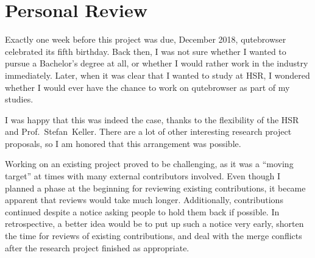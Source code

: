 % 
% 
% 



\section{Personal Review}
Exactly one week before this project was due, December  2018,
qutebrowser celebrated its fifth birthday. Back then, I was not sure whether I
wanted to pursue a Bachelor's degree at all, or whether I would rather work in
the industry immediately. Later, when it was clear that I wanted to study at
HSR, I wondered whether I would ever have the chance to work on qutebrowser as
part of my studies.

I was happy that this was indeed the case, thanks to the flexibility of the
HSR and Prof.~Stefan~Keller. There are a lot of other interesting research
project proposals, so I am honored that this arrangement was possible.

Working on an existing project proved to be challenging, as it was a ``moving
target'' at times with many external contributors involved. Even though I
planned a phase at the beginning for reviewing existing contributions, it became
apparent that reviews would take much longer. Additionally, contributions
continued despite a notice asking people to hold them back if possible. In
retrospective, a better idea would be to put up such a notice very early,
shorten the time for reviews of existing contributions, and deal with the merge
conflicts after the research project finished as appropriate.

